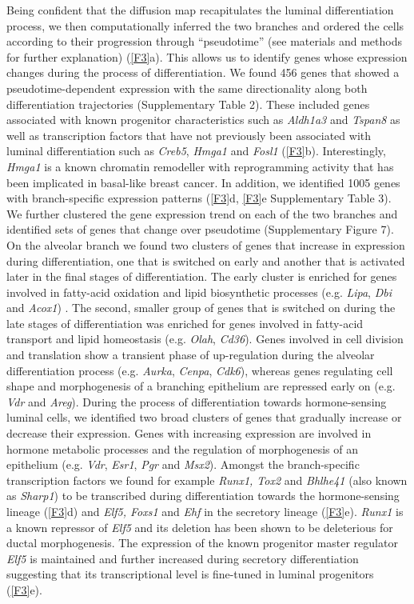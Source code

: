\documentclass[titlepage, 12pt, oneside]{amsart}
\begin{document}
Being confident that the diffusion map recapitulates the luminal differentiation process, we then computationally inferred the two branches and ordered the cells according to their progression through ``pseudotime''\autocite{Haghverdi2016} (see materials and methods for further explanation) (\autoref{F3}a).
This allows us to identify genes whose expression changes during the process of differentiation.
We found 456 genes that showed a pseudotime-dependent expression with the same directionality along both differentiation trajectories (Supplementary Table 2).
These included genes associated with known progenitor characteristics such as \textit{Aldh1a3} and \textit{Tspan8} as well as transcription factors that have not previously been associated with luminal differentiation such as \textit{Creb5}, \textit{Hmga1} and \textit{Fosl1} (\autoref{F3}b).
Interestingly, \textit{Hmga1} is a known chromatin remodeller with reprogramming activity that has been implicated in basal-like breast cancer\autocite{Shah2012,Shah2013}.
In addition, we identified 1005 genes with branch-specific expression patterns (\autoref{F3}d, \autoref{F3}e Supplementary Table 3).
We further clustered the gene expression trend on each of the two branches and identified sets of genes that change over pseudotime (Supplementary Figure 7).
On the alveolar branch we found two clusters of genes that increase in expression during differentiation, one that is switched on early and another that is activated later in the final stages of differentiation.
The early cluster is enriched for genes involved in fatty-acid oxidation and lipid biosynthetic processes (e.g. \textit{Lipa}, \textit{Dbi} and \textit{Acox1}) .
The second, smaller group of genes that is switched on during the late stages of differentiation was enriched for genes involved in fatty-acid transport and lipid homeostasis (e.g. \textit{Olah}, \textit{Cd36}).
Genes involved in cell division and translation show a transient phase of up-regulation during the alveolar differentiation process (e.g. \textit{Aurka}, \textit{Cenpa}, \textit{Cdk6}), whereas genes regulating cell shape and morphogenesis of a branching epithelium are repressed early on (e.g. \textit{Vdr} and \textit{Areg}).
During the process of differentiation towards hormone-sensing luminal cells, we identified two broad clusters of genes that gradually increase or decrease their expression.
Genes with increasing expression are involved in hormone metabolic processes and the regulation of morphogenesis of an epithelium (e.g. \textit{Vdr}, \textit{Esr1}, \textit{Pgr} and \textit{Msx2}).
Amongst the branch-specific transcription factors we found for example \textit{Runx1, Tox2} and \textit{Bhlhe41} (also known as \textit{Sharp1}) to be transcribed during differentiation towards the hormone-sensing lineage (\autoref{F3}d) and \textit{Elf5, Foxs1} and \textit{Ehf} in the secretory lineage (\autoref{F3}e).
\textit{Runx1} is a known repressor of \textit{Elf5} and its deletion has been shown to be deleterious for ductal morphogenesis\autocite{VanBragt2014}.
The expression of the known progenitor master regulator \textit{Elf5} is maintained and further increased during secretory differentiation suggesting that its transcriptional level is fine-tuned in luminal progenitors (\autoref{F3}e).
\end{document}
